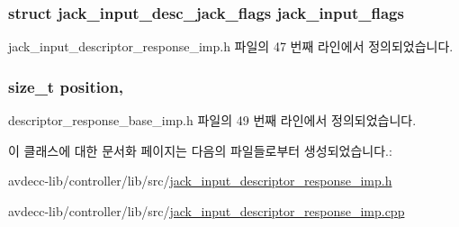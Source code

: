 \subsubsection[{\texorpdfstring{jack\+\_\+input\+\_\+flags}{jack_input_flags}}]{\setlength{\rightskip}{0pt plus 5cm}struct {\bf jack\+\_\+input\+\_\+desc\+\_\+jack\+\_\+flags} jack\+\_\+input\+\_\+flags\hspace{0.3cm}{\ttfamily [private]}}\hypertarget{classavdecc__lib_1_1jack__input__descriptor__response__imp_a279c007c1e27517923deabafa009d1d7}{}\label{classavdecc__lib_1_1jack__input__descriptor__response__imp_a279c007c1e27517923deabafa009d1d7}


jack\+\_\+input\+\_\+descriptor\+\_\+response\+\_\+imp.\+h 파일의 47 번째 라인에서 정의되었습니다.

\subsubsection[{\texorpdfstring{position}{position}}]{\setlength{\rightskip}{0pt plus 5cm}size\+\_\+t position\hspace{0.3cm}{\ttfamily [protected]}, {\ttfamily [inherited]}}\hypertarget{classavdecc__lib_1_1descriptor__response__base__imp_a7a04afe5347934be732ec70a70bd0a28}{}\label{classavdecc__lib_1_1descriptor__response__base__imp_a7a04afe5347934be732ec70a70bd0a28}


descriptor\+\_\+response\+\_\+base\+\_\+imp.\+h 파일의 49 번째 라인에서 정의되었습니다.



이 클래스에 대한 문서화 페이지는 다음의 파일들로부터 생성되었습니다.\+:\begin{DoxyCompactItemize}
\item 
avdecc-\/lib/controller/lib/src/\hyperlink{jack__input__descriptor__response__imp_8h}{jack\+\_\+input\+\_\+descriptor\+\_\+response\+\_\+imp.\+h}\item 
avdecc-\/lib/controller/lib/src/\hyperlink{jack__input__descriptor__response__imp_8cpp}{jack\+\_\+input\+\_\+descriptor\+\_\+response\+\_\+imp.\+cpp}\end{DoxyCompactItemize}

